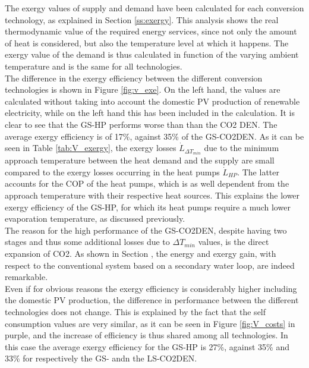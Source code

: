 \documentclass{article}
\begin{document}
The exergy values of supply and demand have been calculated for each conversion technology, as explained in Section \ref{ss:exergy}. This analysis shows the real thermodynamic value of the required energy services, since not only the amount of heat is considered, but also the temperature level at which it happens. The exergy value of the demand is thus calculated in function of the varying ambient temperature and is the same for all technologies.\\

The difference in the exergy efficiency between the different conversion technologies is shown in Figure \ref{fig:v_exe}. On the left hand, the values are calculated without taking into account the domestic PV production of renewable electricity, while on the left hand this has been included in the calculation. It is clear to see that the GS-HP performs worse than than the CO2 DEN. The average exergy efficiency is of 17\%, against 35\% of the GS-CO2DEN. As it can be seen in Table \ref{tab:V_exergy}, the exergy losses $\dot{L}_{\Delta T_{min}}$ due to the minimum approach temperature between the heat demand and the supply are small compared to the exergy losses occurring in the heat pumps $\dot{L}_{HP}$. The latter accounts for the COP of the heat pumps, which is as well dependent from the approach temperature with their respective heat sources. This explains the lower exergy efficiency of the GS-HP, for which its heat pumps require a much lower evaporation temperature, as discussed previously.\\

The reason for the high performance of the GS-CO2DEN, despite having two stages and thus some additional losses due to $\Delta T_{min}$ values, is the direct expansion of CO2. As shown in Section , the energy and exergy gain, with respect to the conventional system based on a secondary water loop, are indeed remarkable.\\

Even if for obvious reasons the exergy efficiency is considerably higher including the domestic PV production, the difference in performance between the different technologies does not change. This is explained by the fact that the self consumption values are very similar, as it can be seen in Figure \ref{fig:V_costs} in purple, and the increase of efficiency is thus shared among all technologies. In this case the average exergy efficiency for the GS-HP is 27\%, against 35\% and 33\% for respectively the GS- andn the LS-CO2DEN.
\end{document}
